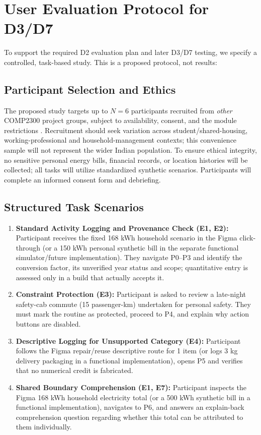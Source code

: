 \documentclass[12pt,a4paper]{article}
\begin{document}
\clearpage
\section{User Evaluation Protocol for D3/D7}

To support the required D2 evaluation plan and later D3/D7 testing, we specify a controlled, task-based study. This is a proposed protocol, not results:

\subsection{Participant Selection and Ethics}
The proposed study targets up to $N=6$ participants recruited from \emph{other} COMP2300 project groups, subject to availability, consent, and the module restrictions \cite{modulebrief}. Recruitment should seek variation across student/shared-housing, working-professional and household-management contexts; this convenience sample will not represent the wider Indian population. To ensure ethical integrity, no sensitive personal energy bills, financial records, or location histories will be collected; all tasks will utilize standardized synthetic scenarios. Participants will complete an informed consent form and debriefing.

\subsection{Structured Task Scenarios}
\begin{enumerate}[label=\textbf{Task \arabic*:},leftmargin=*]
  \item \textbf{Standard Activity Logging and Provenance Check (E1, E2):} Participant receives the fixed 168 kWh household scenario in the Figma click-through (or a 150 kWh personal synthetic bill in the separate functional simulator/future implementation). They navigate P0--P3 and identify the conversion factor, its unverified year status and scope; quantitative entry is assessed only in a build that actually accepts it.
  \item \textbf{Constraint Protection (E3):} Participant is asked to review a late-night safety-cab commute (15 passenger-km) undertaken for personal safety. They must mark the routine as protected, proceed to P4, and explain why action buttons are disabled.
  \item \textbf{Descriptive Logging for Unsupported Category (E4):} Participant follows the Figma repair/reuse descriptive route for 1 item (or logs 3 kg delivery packaging in a functional implementation), opens P5 and verifies that no numerical credit is fabricated.
  \item \textbf{Shared Boundary Comprehension (E1, E7):} Participant inspects the Figma 168 kWh household electricity total (or a 500 kWh synthetic bill in a functional implementation), navigates to P6, and answers an explain-back comprehension question regarding whether this total can be attributed to them individually.
\end{enumerate}
\end{document}
